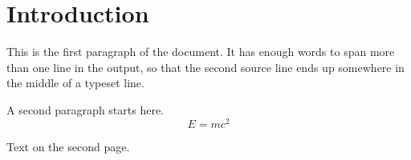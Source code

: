 \documentclass{article}
\begin{document}
\section{Introduction}
This is the first paragraph of the document. It has enough words to
span more than one line in the output, so that the second source line
ends up somewhere in the middle of a typeset line.

A second paragraph starts here.
\[
  E = mc^2
\]

\newpage
Text on the second page.
\end{document}
